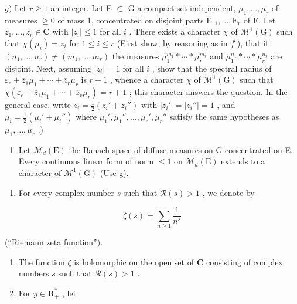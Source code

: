 \(g)\) Let \(r \geqslant 1\) an integer. Let E \(\subset\) G a compact set independent, \(\mu_1, \ldots, \mu_r\) of measures \(\geqslant 0\) of mass 1, concentrated on disjoint parts E \(_1, \ldots, \text{E}_r\) of E. Let \(z_1, \ldots, z_r \in \mathbf{C}\) with \(|z_i| \leqslant 1\) for all \(i\) . There exists a character \(\chi\) of \(\mathcal{M}^1(\text{G})\) such that \(\chi(\mu_i) = z_i\) for \(1 \leqslant i \leqslant r\) (First show, by reasoning as in \(f\) ), that if \((n_1, \ldots, n_r) \neq (m_1, \ldots, m_r)\) the measures \(\mu_1^{m_1} * \cdots * \mu_r^{m_r}\) and \(\mu_1^{n_1} * \cdots * \mu_r^{n_r}\) are disjoint. Next, assuming \(|z_i| = 1\) for all \(i\) , show that the spectral radius of \(\varepsilon_e + \overline{z}_1 \mu_1 + \cdots + \overline{z}_r \mu_r\) is \(r+1\) , whence a character \(\chi\) of \(\mathcal{M}^1(\text{G})\) such that \(\chi(\varepsilon_e + \overline{z}_1 \mu_1 + \cdots + \overline{z}_r \mu_r) = r+1\) ; this character answers the question. In the general case, write \(z_i = \frac{1}{2}(z_i' + z_i'')\) with \(|z_i'| = |z_i''| = 1\) , and \(\mu_i = \frac{1}{2}(\mu_i' + \mu_i'')\) where \(\mu_1', \mu_1'', \ldots, \mu_r', \mu_r''\) satisfy the same hypotheses as \(\mu_1, \ldots, \mu_r\) .)

\begin{enumerate}
\def\labelenumi{\alph{enumi})}
\setcounter{enumi}{7}
\tightlist
\item
  Let \(\mathcal{M}_{d}(\mathrm{E})\) the Banach space of diffuse measures on G concentrated on E. Every continuous linear form of norm \(\leqslant 1\) on \(\mathcal{M}_{d}(\mathrm{E})\) extends to a character of \(\mathcal{M}^{1}(\mathrm{G})\) (Use g).
\end{enumerate}

\begin{enumerate}
\def\labelenumi{\arabic{enumi})}
\setcounter{enumi}{15}
\tightlist
\item
  For every complex number \(s\) such that \(\mathcal{R}(s) > 1\) , we denote by
\end{enumerate}

\[
\zeta (s) = \sum_ {n \geqslant 1} \frac {1}{n ^ {s}}
\]

(“Riemann zeta function”).

\begin{enumerate}
\def\labelenumi{\alph{enumi})}
\item
  The function \(\zeta\) is holomorphic on the open set of \(\mathbf{C}\) consisting of complex numbers \(s\) such that \(\mathcal{R}(s) > 1\) .
\item
  For \(y\in \mathbf{R}_+^*\) , let
\end{enumerate}

